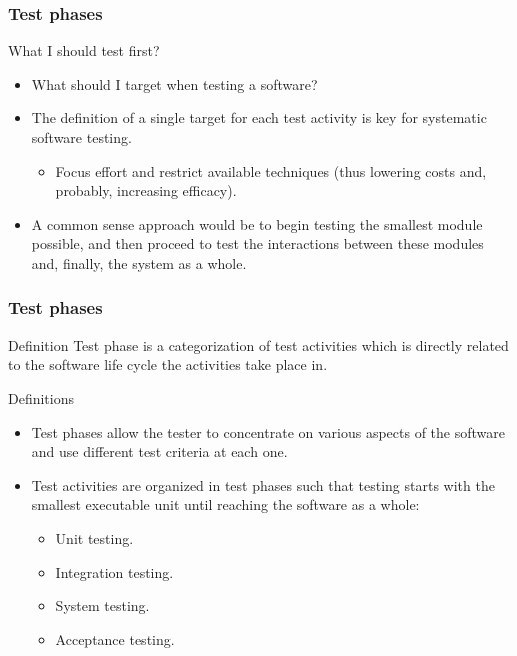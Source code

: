 \begin{frame}[parent={cmap:software-testing-foundations}, hasprev=false, hasnext=true]
\frametitle{Test phases}

\begin{block:fact}{What I should test first?}
\begin{itemize}
	\item What should I target when testing a software?

	\item The definition of a single target for each test activity is key for
	systematic software testing.
	\begin{itemize}
		\item Focus effort and restrict available techniques (thus lowering
		costs and, probably, increasing efficacy).
	\end{itemize}

	\item A common sense approach would be to begin testing the smallest
	module possible, and then proceed to test the interactions between these
	modules and, finally, the system as a whole.
\end{itemize}
\end{block:fact}
\end{frame}


\begin{frame}[hasprev=true, hasnext=true]
\frametitle{Test phases}
\label{concept:test-phase}
\label{concept:phase}

\begin{block:concept}{Definition}
Test phase is a categorization of test activities which is directly related
to the software life cycle the activities take place in.
\end{block:concept}

\begin{block:fact}{Definitions}
\begin{itemize}
	\item Test phases allow the tester to concentrate on various aspects of
	the software and use different test criteria at each one.

	\item Test activities are organized in test phases such that testing starts
	with the smallest executable unit until reaching the software as a whole:
	\begin{itemize}
		\item Unit testing.
		\item Integration testing.
		\item System testing.
		\item Acceptance testing.
	\end{itemize}
\end{itemize}
\end{block:fact}
\end{frame}


